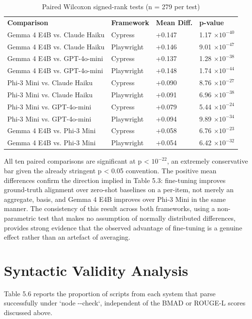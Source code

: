\begin{longtable}[]{@{}llll@{}}
\caption{Paired Wilcoxon signed-rank tests (n = 279 per test)}\tabularnewline
\toprule
\endhead
\textbf{Comparison} & \textbf{Framework} & \textbf{Mean Diff.} &
\textbf{p-value} \\
Gemma 4 E4B vs. Claude Haiku & Cypress & +0.147 & 1.17 $\times 10^{-40}$ \\
Gemma 4 E4B vs. Claude Haiku & Playwright & +0.146 & 9.01 $\times 10^{-47}$ \\
Gemma 4 E4B vs. GPT-4o-mini & Cypress & +0.137 & 1.28 $\times 10^{-38}$ \\
Gemma 4 E4B vs. GPT-4o-mini & Playwright & +0.148 & 1.74 $\times 10^{-44}$ \\
Phi-3 Mini vs. Claude Haiku & Cypress & +0.090 & 8.76 $\times 10^{-27}$ \\
Phi-3 Mini vs. Claude Haiku & Playwright & +0.091 & 6.96 $\times 10^{-38}$ \\
Phi-3 Mini vs. GPT-4o-mini & Cypress & +0.079 & 5.44 $\times 10^{-24}$ \\
Phi-3 Mini vs. GPT-4o-mini & Playwright & +0.094 & 9.89 $\times 10^{-34}$ \\
Gemma 4 E4B vs. Phi-3 Mini & Cypress & +0.058 & 6.76 $\times 10^{-23}$ \\
Gemma 4 E4B vs. Phi-3 Mini & Playwright & +0.054 & 6.42 $\times 10^{-32}$ \\
\bottomrule
\end{longtable}

All ten paired comparisons are significant at p \textless{} $10^{-22}$, an
extremely conservative bar given the already stringent p \textless{}
0.05 convention. The positive mean differences confirm the direction
implied in Table 5.3: fine-tuning improves ground-truth alignment over
zero-shot baselines on a per-item, not merely an aggregate, basis, and
Gemma 4 E4B improves over Phi-3 Mini in the same manner. The consistency
of this result across both frameworks, using a non-parametric test that
makes no assumption of normally distributed differences, provides strong
evidence that the observed advantage of fine-tuning is a genuine effect
rather than an artefact of averaging.

\section{Syntactic Validity Analysis}

Table 5.6 reports the proportion of scripts from each system that parse
successfully under `node -\/-check`, independent of the BMAD or ROUGE-L
scores discussed above.

